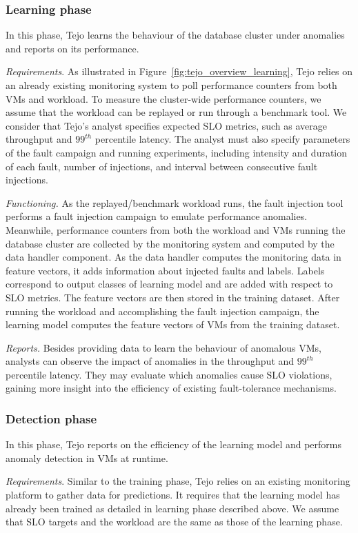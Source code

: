 \subsubsection{Learning phase} In this phase, Tejo learns the behaviour of the database cluster under anomalies and reports on its performance.

\emph{Requirements}. As illustrated in Figure~\ref{fig:tejo_overview_learning}, Tejo relies on an already existing monitoring system to poll performance counters from both VMs and workload. To measure the cluster-wide performance counters, we assume that the workload can be replayed or run through a benchmark tool. We consider that Tejo's analyst specifies expected SLO metrics, such as average throughput and $99^{th}$ percentile latency. The analyst must also specify parameters of the fault campaign and running experiments, including intensity and duration of each fault, number of injections, and interval between consecutive fault injections. 

\emph{Functioning.} As the replayed/benchmark workload runs, the fault injection tool performs a fault injection campaign to emulate performance anomalies. Meanwhile, performance counters from both the workload and VMs running the database cluster are collected by the monitoring system and computed by the data handler component. As the data handler computes the monitoring data in feature vectors, it adds information about injected faults and labels. Labels correspond to output classes of learning model and are added with respect to SLO metrics. The feature vectors are then stored in the training dataset. After running the workload and accomplishing the fault injection campaign, the learning model computes the feature vectors of VMs from the training dataset.

\emph{Reports.} Besides providing data to learn the behaviour of anomalous VMs, analysts can observe the impact of anomalies in the throughput and $99^{th}$ percentile latency. They may evaluate which anomalies cause SLO  violations, gaining more insight into the efficiency of existing fault-tolerance mechanisms. 

\subsubsection{Detection phase} In this phase, Tejo reports on the efficiency of the learning model and performs anomaly detection in VMs at runtime. 

\emph{Requirements}. Similar to the training phase, Tejo relies on an existing monitoring platform to gather data for predictions. It requires that the learning model has already been trained as detailed in learning phase described above. We assume that SLO targets and the workload are the same as those of the learning phase. 

